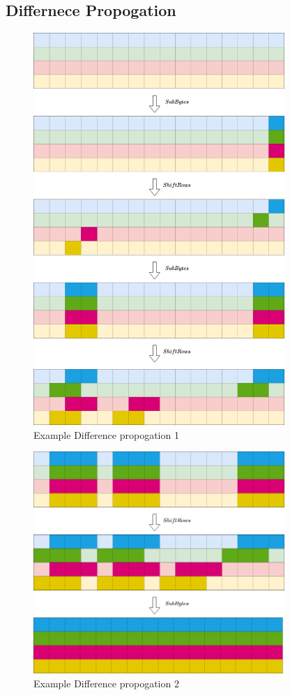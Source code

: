 \documentclass[final]{transcrypto}
\begin{document}
\subsection{Differnece Propogation}
\begin{figure}[H]
\caption{Example Difference propogation 1}
\centering
\includegraphics[width=0.85\textwidth]{images/diff_prop1_xor.png}
\end{figure}
\begin{figure}[H]
\caption{Example Difference propogation 2}
\centering
\includegraphics[width=0.85\textwidth]{images/diff_prop2_xor.png}
\end{figure}
\end{document}
